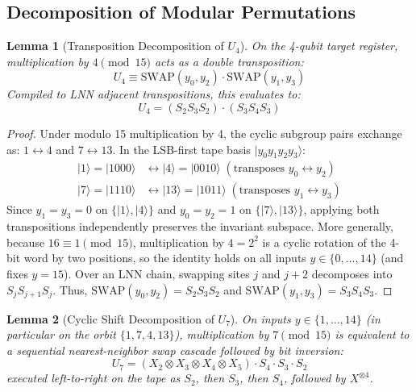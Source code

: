 \documentclass[11pt,a4paper,twocolumn]{article}
\newcommand{\ket}[1]{| #1 \rangle}
\newtheorem{lemma}{Lemma}
\begin{document}
\subsection{Decomposition of Modular Permutations}

\begin{lemma}[Transposition Decomposition of $U_4$]
On the 4-qubit target register, multiplication by $4 \pmod{15}$ acts as a double transposition:
\begin{equation}
    U_4 \equiv \text{SWAP}(y_0, y_2) \cdot \text{SWAP}(y_1, y_3)
\end{equation}
Compiled to LNN adjacent transpositions, this evaluates to:
\begin{equation}
    U_4 = (S_2 S_3 S_2) \cdot (S_3 S_4 S_3)
\end{equation}
\end{lemma}

\begin{proof}
Under modulo 15 multiplication by 4, the cyclic subgroup pairs exchange as: $1 \leftrightarrow 4$ and $7 \leftrightarrow 13$. In the LSB-first tape basis $\ket{y_0 y_1 y_2 y_3}$:
\begin{align*}
    \ket{1} = \ket{1000} &\leftrightarrow \ket{4} = \ket{0010} \; (\text{transposes } y_0 \leftrightarrow y_2) \\
    \ket{7} = \ket{1110} &\leftrightarrow \ket{13} = \ket{1011} \; (\text{transposes } y_1 \leftrightarrow y_3)
\end{align*}
Since $y_1 = y_3 = 0$ on $\{\ket{1}, \ket{4}\}$ and $y_0 = y_2 = 1$ on $\{\ket{7}, \ket{13}\}$, applying both transpositions independently preserves the invariant subspace. More generally, because $16 \equiv 1 \pmod{15}$, multiplication by $4 = 2^2$ is a cyclic rotation of the 4-bit word by two positions, so the identity holds on all inputs $y \in \{0, \dots, 14\}$ (and fixes $y = 15$). Over an LNN chain, swapping sites $j$ and $j+2$ decomposes into $S_j S_{j+1} S_j$. Thus, $\text{SWAP}(y_0, y_2) = S_2 S_3 S_2$ and $\text{SWAP}(y_1, y_3) = S_3 S_4 S_3$.
\end{proof}

\begin{lemma}[Cyclic Shift Decomposition of $U_7$]
On inputs $y \in \{1, \dots, 14\}$ (in particular on the orbit $\{1, 7, 4, 13\}$), multiplication by $7 \pmod{15}$ is equivalent to a sequential nearest-neighbor swap cascade followed by bit inversion:
\begin{equation}
    U_7 = (X_2 \otimes X_3 \otimes X_4 \otimes X_5) \cdot S_4 \cdot S_3 \cdot S_2
\end{equation}
executed left-to-right on the tape as $S_2$, then $S_3$, then $S_4$, followed by $X^{\otimes 4}$.
\end{lemma}
\end{document}
